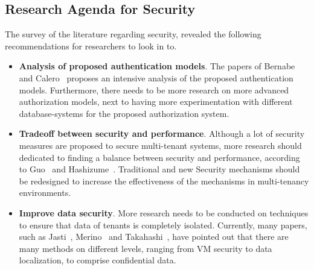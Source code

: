 \subsection{Research Agenda for Security}
The survey of the literature regarding security, revealed the following recommendations for researchers to look in to. 
\begin{itemize}
    \item \textbf{Analysis of proposed authentication models}.
        The papers of Bernabe~\cite{Bernabe2012Auth} and Calero~\cite{Calero2010Auth} proposes an intensive analysis of the proposed authentication models. Furthermore, there needs to be more research on more advanced authorization models, next to having more experimentation with different database-systems for the proposed authorization system.
    \item \textbf{Tradeoff between security and performance}.
        Although a lot of security measures are proposed to secure multi-tenant systems, more research should dedicated to finding a balance between security and performance, according to Guo~\cite{guo2007framework} and Hashizume~\cite{Hashizume2013Security}. Traditional and new Security mechanisms should be redesigned to increase the effectiveness of the mechanisms in multi-tenancy environments.
    \item \textbf{Improve data security}.
        More research needs to be conducted on techniques to ensure that data of tenants is completely isolated. Currently, many papers, such as Jasti~\cite{Jasti2010Security}, Merino~\cite{Merino2011Security} and Takahashi~\cite{Takahashi2012Security}, have pointed out that there are many methods on different levels, ranging from VM security to data localization, to comprise confidential data. 
\end{itemize}

